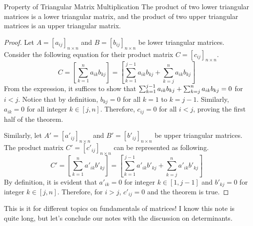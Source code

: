 \documentclass[../../../main.tex]{subfiles}
\begin{document}
\begin{theorem}{}{Property of Triangular Matrix Multiplication}
The product of two lower triangular matrices is a lower triangular
matrix, and the product of two upper triangular matrices is an upper
triangular matrix.
\end{theorem}
\begin{proof}
Let $A = [a_{ij}]_{n \times n}$ and $B = [b_{ij}]_{n \times n}$ be
lower triangular matrices. Consider the following equation for their
product matrix $C = [c_{ij}]_{n \times n}$.
\[
C
= \left[ \sum_{k = 1}^{n} a_{ik} b_{kj} \right]
= \left[
    \sum_{k = 1}^{j-1} a_{ik} b_{kj}
        + \sum_{k = j}^{n} a_{ik} b_{kj}
\right]
\]
From the expression, it suffices to show that $\sum_{k = 1}^{j-1}
a_{ik} b_{kj} + \sum_{k = j}^{n} a_{ik} b_{kj} \linebreak = 0$ for
$i < j$. Notice that by definition, $b_{kj} = 0$ for all $k = 1$ to
$k = j-1$. Similarly, $a_{ik} = 0$ for all integer $k \in [j, n]$.
Therefore, $c_{ij} = 0$ for all $i < j$, proving the first half of
the theorem.

Similarly, let $A' = [a'_{ij}]_{n \times n}$ and $B' =
[b'_{ij}]_{n \times n}$ be upper triangular matrices. The product
matrix $C'= [c'_{ij}]_{n \times n}$ can be represented as following.
\[
C'
= \left[ \sum_{k = 1}^{n} a'_{ik} b'_{kj} \right]
= \left[
    \sum_{k = 1}^{j-1} a'_{ik} b'_{kj}
        + \sum_{k = j}^{n} a'_{ik} b'_{kj}
\right]
\]
By definition, it is evident that $a'_{ik} = 0$ for integer $k
\in [1, j-1]$ and $b'_{kj} = 0$ for integer $k \in [j, n]$.
Therefore, for $i > j$, $c'_{ij} = 0$ and the theorem is true.
\end{proof}

This is it for different topics on fundamentals of matrices! I know
this note is quite long, but let's conclude our notes with the
discussion on determinants.
\end{document}
